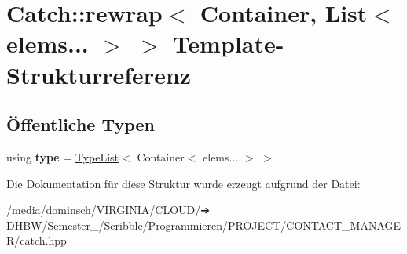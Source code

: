 \hypertarget{structCatch_1_1rewrap_3_01Container_00_01List_3_01elems_8_8_8_01_4_01_4}{}\section{Catch\+:\+:rewrap$<$ Container, List$<$ elems... $>$ $>$ Template-\/\+Strukturreferenz}
\label{structCatch_1_1rewrap_3_01Container_00_01List_3_01elems_8_8_8_01_4_01_4}
\subsection*{Öffentliche Typen}
\begin{DoxyCompactItemize}
\item 
\mbox{\label{structCatch_1_1rewrap_3_01Container_00_01List_3_01elems_8_8_8_01_4_01_4_ac61d11b30e96c1d6e684ead867efc8ba}} 
using {\bfseries type} = \hyperlink{structCatch_1_1TypeList}{Type\+List}$<$ Container$<$ elems... $>$ $>$
\end{DoxyCompactItemize}


Die Dokumentation für diese Struktur wurde erzeugt aufgrund der Datei\+:\begin{DoxyCompactItemize}
\item 
/media/dominsch/\+V\+I\+R\+G\+I\+N\+I\+A/\+C\+L\+O\+U\+D/➔ D\+H\+B\+W/\+Semester\+\_/\+Scribble/\+Programmieren/\+P\+R\+O\+J\+E\+C\+T/\+C\+O\+N\+T\+A\+C\+T\+\_\+\+M\+A\+N\+A\+G\+E\+R/catch.\+hpp\end{DoxyCompactItemize}
